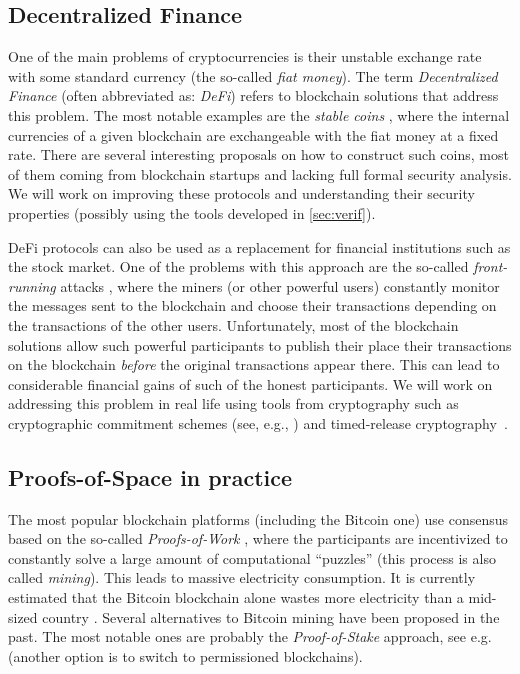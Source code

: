 \documentclass{article}
\begin{document}
\subsection{Decentralized Finance}

One of the main problems of cryptocurrencies is their unstable exchange rate with some standard currency (the so-called \emph{fiat money}). The term \emph{Decentralized Finance} \cite{enwiki:1030159409} (often abbreviated as: \emph{DeFi}) refers to blockchain solutions that address this problem. The most notable examples are the \emph{stable coins} \cite{Clark2020}, where the internal currencies of a given blockchain are exchangeable with the fiat money at a fixed rate. There are several interesting proposals on how to construct such coins, most of them coming from blockchain startups and lacking full formal security analysis. We will work on improving these protocols and understanding their security properties (possibly using the tools developed in \ref{sec:verif}).
	
DeFi protocols can also be used as a replacement for financial institutions such as the stock market. One of the problems with this approach are the so-called \emph{front-running} attacks \cite{Eskandari2019}, where the miners (or other powerful users) constantly monitor the messages sent to the blockchain and choose their transactions depending on the transactions of the other users. Unfortunately, most of the blockchain solutions allow such powerful participants to publish their place their transactions on the blockchain \emph{before} the original transactions appear there. This can lead to considerable financial gains of such of the honest participants. We will work on addressing this problem in real life using tools from cryptography such as cryptographic commitment schemes (see, e.g., \cite{Goldreich2001}) and timed-release cryptography~\cite{10.5555/888615}.

\subsection{Proofs-of-Space in practice}\label{sec:PoSpace}

The most popular blockchain platforms (including the Bitcoin one) use consensus based on the so-called \emph{Proofs-of-Work} \cite{Dwork1992}, where the participants are incentivized to constantly solve a large amount of computational ``puzzles'' (this process is also called \emph{mining}). This leads to massive electricity consumption. It is currently estimated that the Bitcoin blockchain alone wastes more electricity than a mid-sized country \cite{Criddle}. Several alternatives to Bitcoin mining have been proposed in the past. The most notable ones are probably the \emph{Proof-of-Stake} approach, see e.g.~\cite{Kiayias2017} (another option is to switch to permissioned blockchains).
\end{document}
